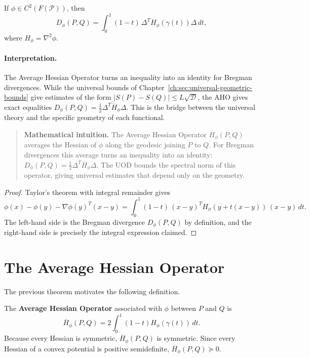 \begin{theorem}\label{ch:thm:15-1}

If \(\phi\in C^{2}(F(\mathcal P))\), then
\[ D_\phi(P,Q) = \int_0^{1} (1-t)\,\Delta^T
H_\phi(\gamma(t)) \Delta\,dt, \]
where
$H_\phi=\nabla^2\phi.$
\end{theorem}

\paragraph{Interpretation.}
The Average Hessian Operator turns an inequality into an identity for Bregman divergences.  While the universal bounds of Chapter~\ref{ch:sec:universal-geometric-bounds} give estimates of the form $|S(P)-S(Q)|\le L\sqrt{\mathcal D}$, the AHO gives exact equalities $D_\phi(P,Q)=\frac12\Delta^T\overline H_\phi\Delta$.  This is the bridge between the universal theory and the specific geometry of each functional.

\begin{quote}
\textbf{Mathematical intuition.}
The Average Hessian Operator $\overline H_\phi(P,Q)$ averages the Hessian of $\phi$ along the geodesic joining $P$ to $Q$.
For Bregman divergences this average turns an inequality into an identity: $D_\phi(P,Q)=\frac12\Delta^T\overline H_\phi\Delta$.
The UOD bounds the spectral norm of this operator, giving universal estimates that depend only on the geometry.
\end{quote}

\begin{proof}
Taylor's theorem with integral remainder gives
\[
\phi(x) - \phi(y) - \nabla\phi(y)^T(x-y)
= \int_0^{1} (1-t)\,(x-y)^T H_\phi(y+t(x-y))\,(x-y)\,dt.
\]
The left-hand side is the Bregman divergence $D_\phi(P,Q)$ by definition,
and the right-hand side is precisely the integral expression claimed. 
\end{proof}



\section{The Average Hessian Operator}\label{ch:sec:the-average-hessian-operator}
The previous theorem motivates the following definition.
\begin{definition}
\label{ch:defn:15-1}
The \textbf{Average Hessian Operator} associated with \(\phi\) between
\(P\) and \(Q\) is
\[ \boxed{
\overline H_\phi(P,Q)
=
2\int_0^1
(1-t)
H_\phi(\gamma(t))\,dt.
} \]
Because every Hessian is symmetric,
$\overline H_\phi(P,Q)$
is symmetric.
Since every Hessian of a convex potential is positive semidefinite,
$\overline H_\phi(P,Q)\succeq0.$
\end{definition}

